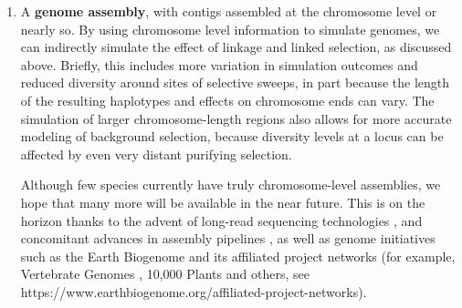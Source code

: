 \documentclass[hidelinks]{article}
\providecommand{\tightlist}{%
\setlength{\itemsep}{0pt}\setlength{\parskip}{0pt}}
\begin{document}
\begin{enumerate}
\def\labelenumi{\arabic{enumi}.}
\tightlist
\item
  A \textbf{genome assembly}, with contigs assembled at the chromosome
  level or nearly so. By using chromosome level information to simulate
  genomes, we can indirectly simulate the effect of linkage and linked
  selection, as discussed above. Briefly, this includes more variation
  in simulation outcomes and reduced diversity around sites of selective
  sweeps, in part because the length of the resulting haplotypes and effects on
  chromosome ends can vary. The simulation of larger chromosome-length regions
  also allows for more accurate modeling of background selection, because
  diversity levels at a locus can be affected by even very distant purifying
  selection.

Although few species currently have truly chromosome-level assemblies,
we hope that many more will be available in the near future.
This is on the horizon thanks to the advent of long-read sequencing technologies
\citep{Amarasinghe2020}, and concomitant advances in assembly pipelines
\citep{Chakraborty2016}, as well as genome initiatives such as the Earth Biogenome
\citep{Lewin2022} and its affiliated project networks (for example,
Vertebrate Genomes \citep{Rhie2021}, 10,000 Plants \citep{Cheng2018} and others,
see https://www.earthbiogenome.org/affiliated-project-networks).


\end{enumerate}
\end{document}

